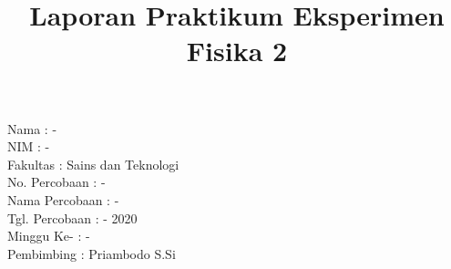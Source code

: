 \documentclass{article}
\title{Laporan Praktikum Eksperimen Fisika 2}
\author{  }
\date{  }
\begin{document}
	\begin{titlepage}
		\huge\maketitle 
		\thispagestyle{empty} 
		\noindent \huge{Nama\hspace{3.7cm} : -}\\
		\huge{NIM\hspace{4.1cm} : -}\\
		\huge{Fakultas\hspace{2.96cm} : Sains dan Teknologi}\\
		\huge{No. Percobaan\hspace{1.07cm} : -}\\
		\huge{Nama Percobaan \hspace{0.4cm} : -}\\
		\huge{Tgl. Percobaan \hspace{0.62cm} : - 2020}\\
		\huge{Minggu Ke- \hspace{1.65cm} : -}\\
		\huge{Pembimbing \hspace{1.46cm} : Priambodo S.Si}
	\end{titlepage}
\end{document}
